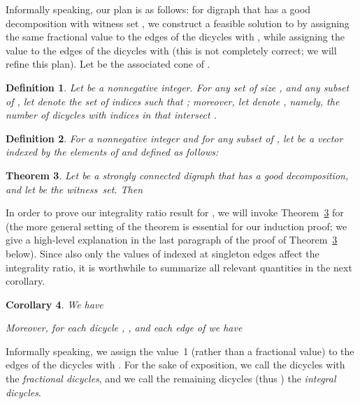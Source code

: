 \documentclass[11pt]{article}
\newtheorem{theorem}{Theorem}[section]
\newtheorem{corollary}[theorem]{Corollary}
\newtheorem{definition}[theorem]{Definition}
\begin{document}
Informally speaking, our plan is as follows:
for digraph  that has a good decomposition with witness set ,
we construct a feasible solution to 
by assigning the same fractional value to the edges of
the dicycles  with ,
while assigning the value 
to the edges of the dicycles  with 
(this is not completely correct; we will refine this plan).
Let  be the associated cone of .




\begin{definition}
\label{def:goodfrac}
Let  be a nonnegative integer.
For any set  of size , and
any subset  of ,
let  denote
the set of indices  such that
;
moreover, let  denote ,
namely, the number of dicycles  with indices in 
that intersect .
\end{definition}


\begin{definition}
\label{def:balanced}
For a nonnegative integer  and
for any subset  of ,
let  be a vector indexed by the elements of
 and defined as follows:

\end{definition}

\begin{theorem}
\label{thm:balanced}
Let  be a strongly connected digraph that
has a good decomposition,
and let  be the witness~set. Then

\end{theorem}
In order to prove our integrality ratio result for , we will invoke Theorem~\ref{thm:balanced} for  (the more general setting of the theorem is essential for our induction proof; we give a high-level explanation in the last paragraph of the proof of Theorem~\ref{thm:balanced} below). 
Since also only the values of  indexed at singleton edges affect the integrality ratio, 
it is worthwhile to summarize all relevant quantities in the next corollary. 


\begin{corollary}
\label{coro:balanced-empty}
We have

Moreover, 
for each dicycle , , and each edge  of  we have

\end{corollary}


Informally speaking, we assign the value~1
(rather than a fractional value) to the edges of
the dicycles  with .
For the sake of exposition,
we call the dicycles  with 
the \emph{fractional dicycles}, and
we call the remaining dicycles 
(thus ) the \emph{integral dicycles}.
\end{document}
